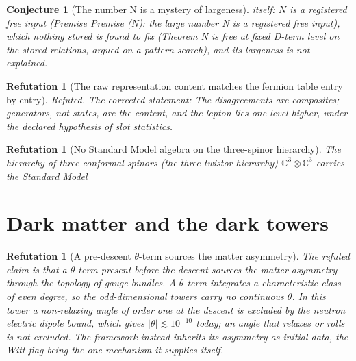 \documentclass[11pt]{article}
\newtheorem{conjecture}[theorem]{Conjecture}
\newtheorem{refutation}[theorem]{Refutation}
\theoremstyle{definition}
\theoremstyle{plain}
\newcommand{\changedmark}[2]{\marginpar{\raggedright\scriptsize\color{#1}#2}}
\providecommand{\C}{}\renewcommand{\C}{\mathbb{C}}
\begin{document}
\begin{conjecture}[The number N is a mystery of largeness]
itself: $N$ is a registered free input (Premise \emph{Premise (N): the large number N is a registered free input}), which nothing stored is found to fix (Theorem \emph{N is free at fixed D-term level on the stored relations}, argued on a pattern search), and its largeness is not explained.
\end{conjecture}

\begin{refutation}[The raw representation content matches the fermion table entry by entry]\label{c:refuted.the-raw-representation-content-matches-the-fermi}
Refuted. The corrected statement: The disagreements are composites; generators, not states, are the content, and the lepton lies one level higher, under the declared hypothesis of slot statistics.
\end{refutation}

\begin{refutation}[No Standard Model algebra on the three-spinor hierarchy]\label{c:refuted.the-three-twistor-hierarchy-carries-the-standard}
\changedmark{BurntOrange}{changed since the deposit}
The hierarchy of three conformal spinors (the three-twistor hierarchy) $\C^{3} \otimes \C^{3}$ carries the Standard Model
\end{refutation}

\section{Dark matter and the dark towers}

\begin{refutation}[A pre-descent $\theta$-term sources the matter asymmetry]\label{c:refuted.a-pre-descent-term-sources-the-matter-asymmetry}
The refuted claim is that a $\theta$-term present before the descent sources the matter asymmetry through the topology of gauge bundles. A $\theta$-term integrates a characteristic class of even degree, so the odd-dimensional towers carry no continuous $\theta$. In this tower a non-relaxing angle of order one at the descent is excluded by the neutron electric dipole bound, which gives $|\theta| \lesssim 10^{-10}$ today; an angle that relaxes or rolls is not excluded. The framework instead inherits its asymmetry as initial data, the Witt flag being the one mechanism it supplies itself.
\end{refutation}
\end{document}
